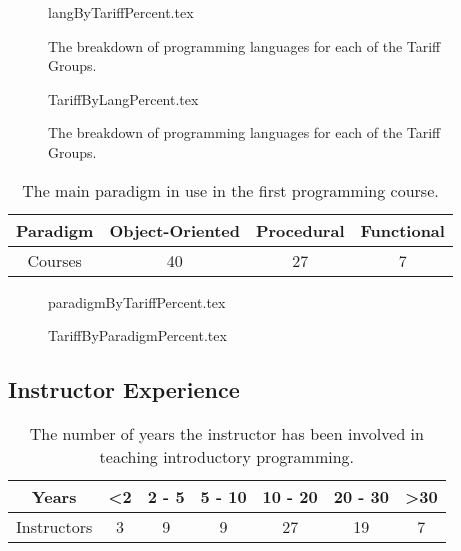 \documentclass{sig-alternate}
\begin{document}
\begin{figure}
\begin{center}
{langByTariffPercent.tex}
\end{center}
\caption{The breakdown of programming languages for each of the Tariff Groups.}
\end{figure}

\begin{figure}
\begin{center}
{TariffByLangPercent.tex}
\end{center}
\caption{The breakdown of programming languages for each of the Tariff Groups.}
\end{figure}

\begin{table}[]
\centering
\caption{The main paradigm in use in the first programming course.}
\label{tab:paradigm}
\begin{tabular}{cccc}
\hline
Paradigm & Object-Oriented & Procedural & Functional \\ \hline
Courses  & 40              & 27         & 7          \\ \hline
\end{tabular}
\end{table}

\begin{figure}
\begin{center}
{paradigmByTariffPercent.tex}
\end{center}
\caption{}
\end{figure}

\begin{figure}
\begin{center}
{TariffByParadigmPercent.tex}
\end{center}
\caption{}
\end{figure}

\subsection{Instructor Experience}

\begin{table}[]
\centering
\caption{The number of years the instructor has been involved in teaching introductory programming.}
\label{tab:yearsTeaching}
\begin{tabular}{ccccccc}
\hline
Years       & \textless 2 & 2 - 5 & 5 - 10 & 10 - 20 & 20 - 30 & \textgreater 30 \\ \hline
Instructors & 3          & 9     & 9      & 27      & 19      & 7              \\ \hline
\end{tabular}
\end{table}
\end{document}
